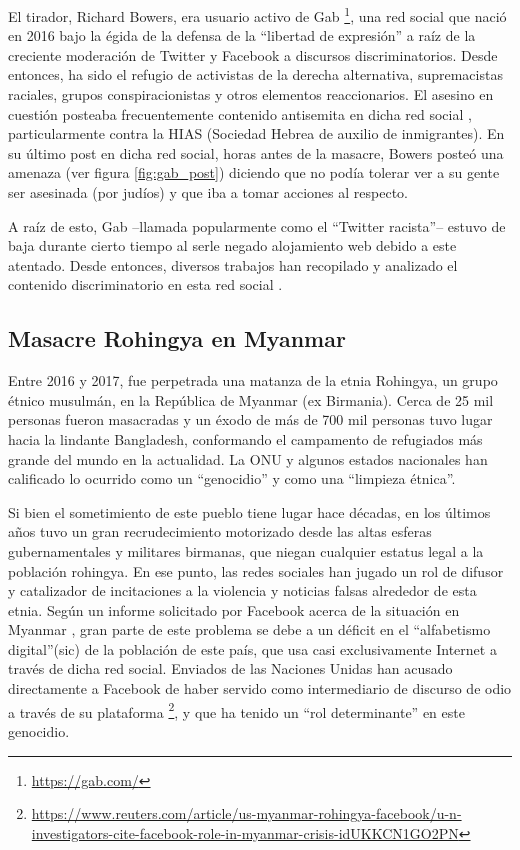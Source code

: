 El tirador, Richard Bowers, era usuario activo de Gab \footnote{\url{https://gab.com/}}, una red social que nació en 2016 bajo la égida de la defensa de la ``libertad de expresión'' a raíz de la creciente moderación de Twitter y Facebook a discursos discriminatorios. Desde entonces, ha sido el refugio de activistas de la derecha alternativa, supremacistas raciales, grupos conspiracionistas y otros elementos reaccionarios. El asesino en cuestión posteaba frecuentemente contenido antisemita en dicha red social \cite{mcilroy2019welcome}, particularmente contra la HIAS (Sociedad Hebrea de auxilio de inmigrantes). En su último post en dicha red social, horas antes de la masacre, Bowers posteó una amenaza (ver figura \ref{fig:gab_post}) diciendo que no podía tolerar ver a su gente ser asesinada (por judíos) y que iba a tomar acciones al respecto.

A raíz de esto, Gab --llamada popularmente como el ``Twitter racista''-- estuvo de baja durante cierto tiempo al serle negado alojamiento web debido a este atentado. Desde entonces, diversos trabajos han recopilado y analizado el contenido discriminatorio en esta red social \cite{mcilroy2019welcome,kennedy2018gab}.



\subsection{Masacre Rohingya en Myanmar}
%
Entre 2016 y 2017, fue perpetrada una matanza de la etnia Rohingya, un grupo étnico musulmán, en la República de Myanmar (ex Birmania). Cerca de 25 mil personas fueron masacradas y un éxodo de más de 700 mil personas tuvo lugar hacia la lindante Bangladesh, conformando el campamento de refugiados más grande del mundo en la actualidad. La ONU y algunos estados nacionales han calificado lo ocurrido como un ``genocidio'' y como una ``limpieza étnica''.


Si bien el sometimiento de este pueblo tiene lugar hace décadas, en los últimos años tuvo un gran recrudecimiento motorizado desde las altas esferas gubernamentales y militares birmanas, que niegan cualquier estatus legal a la población rohingya. En ese punto, las redes sociales han jugado un rol de difusor y catalizador de incitaciones a la violencia y noticias falsas alrededor de esta etnia. Según un informe solicitado por Facebook acerca de la situación en Myanmar \cite{warofka2018independent}, gran parte de este problema se debe a un déficit en el ``alfabetismo digital''(sic) de la población de este país, que usa casi exclusivamente Internet a través de dicha red social. Enviados de las Naciones Unidas han acusado directamente a Facebook de haber servido como intermediario de discurso de odio a través de su plataforma \footnote{\url{https://www.reuters.com/article/us-myanmar-rohingya-facebook/u-n-investigators-cite-facebook-role-in-myanmar-crisis-idUKKCN1GO2PN}}, y que ha tenido un ``rol determinante'' en este genocidio.

